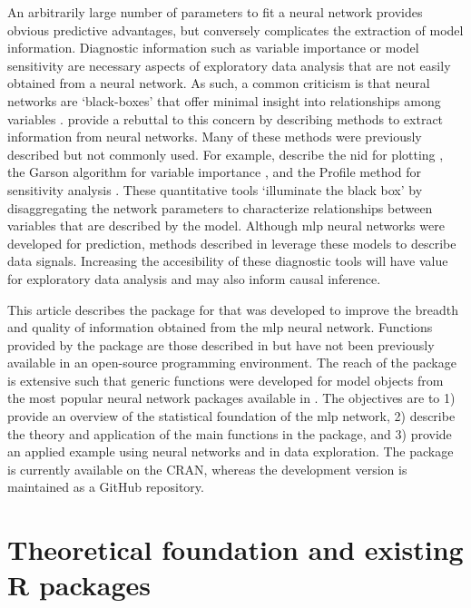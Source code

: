 \documentclass[article,shortnames]{jss}\usepackage[]{graphicx}\usepackage[]{color}
\begin{document}
An arbitrarily large number of parameters to fit a neural network provides obvious predictive advantages, but conversely complicates the extraction of model information.  Diagnostic information such as variable importance or model sensitivity are necessary aspects of exploratory data analysis that are not easily obtained from a neural network. As such, a common criticism is that neural networks are `black-boxes' that offer minimal insight into relationships among variables \citep[e.g.,][]{Paruelo97}.  \citet{Olden02} provide a rebuttal to this concern by describing methods to extract information from neural networks.  Many of these methods were previously described but not commonly used.  For example, \citet{Olden02} describe  the \ac{nid} for plotting \citep{Ozesmi99}, the Garson algorithm for variable importance \citep{Garson91}, and the Profile method for sensitivity analysis \citep{Lek96}.  These quantitative tools `illuminate the black box' by disaggregating the network parameters to characterize relationships between variables that are described by the model.  Although \ac{mlp} neural networks were developed for prediction, methods described in \citet{Olden02} leverage these models to describe data signals.  Increasing the accesibility of these diagnostic tools will have value for exploratory data analysis and may also inform causal inference.

This article describes the  package for  that was developed to improve the breadth and quality of information obtained from the \ac{mlp} neural network.  Functions provided by the package are those described in \citet{Olden02} but have not been previously available in an open-source programming environment.  The reach of the package is extensive such that generic functions were developed for model objects from the most popular neural network packages available in .  The objectives are to 1) provide an overview of the statistical foundation of the \ac{mlp} network, 2) describe the theory and application of the main functions in the  package, and 3) provide an applied example using neural networks and  in data exploration.  The package is currently available on the \ac{CRAN}, whereas the development version is maintained as a GitHub repository.  

\section[Theoretical foundation]{Theoretical foundation and existing R packages}
\end{document}
